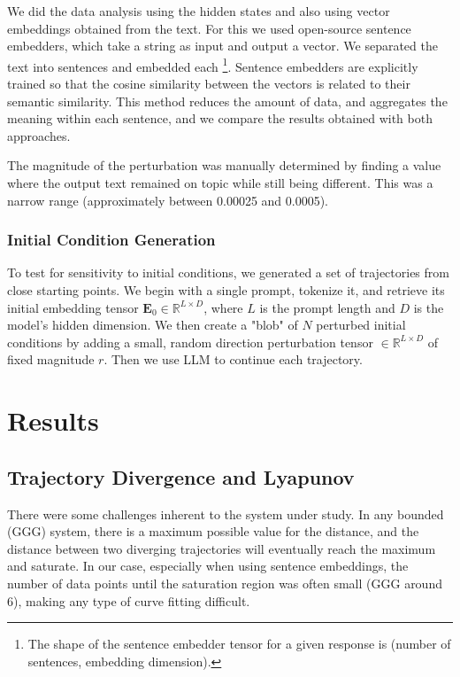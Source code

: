 \documentclass[a4paper,12pt]{article}
\begin{document}
We did the data analysis using the hidden states and also using vector embeddings obtained from the text. For this we used open-source sentence embedders, which take a string as input and output a vector. We separated the text into sentences and embedded each \footnote{The shape of the sentence embedder tensor for a given response is (number of sentences, embedding dimension).}. Sentence embedders are explicitly trained so that the cosine similarity between the vectors is related to their semantic similarity. This method reduces the amount of data, and aggregates the meaning within each sentence, and we compare the results obtained with both approaches.

The magnitude of the perturbation was manually determined by finding a value where the output text remained on topic while still being different. This was a narrow range (approximately between 0.00025 and 0.0005).


\subsubsection{Initial Condition Generation}
\label{subsec:init_cond_gen}
To test for sensitivity to initial conditions, we generated a set of trajectories from close starting points. We begin with a single prompt, tokenize it, and retrieve its initial embedding tensor $\mathbf{E}_0 \in \mathbb{R}^{L \times D}$, where $L$ is the prompt length and $D$ is the model's hidden dimension. We then create a "blob" of $N$ perturbed initial conditions by adding a small, random direction perturbation tensor $\in \mathbb{R}^{L \times D}$ of fixed magnitude $r$. Then we use LLM to continue each trajectory.

\section{Results}
\label{sec:results}

\subsection{Trajectory Divergence and Lyapunov} \label{res:lyapunov} %

There were some challenges inherent to the system under study. In any bounded (GGG) system, there is a maximum possible value for the distance, and the distance between two diverging trajectories will eventually reach the maximum and saturate. In our case, especially when using sentence embeddings, the number of data points until the saturation region was often small (GGG around 6), making any type of curve fitting difficult.
\end{document}
